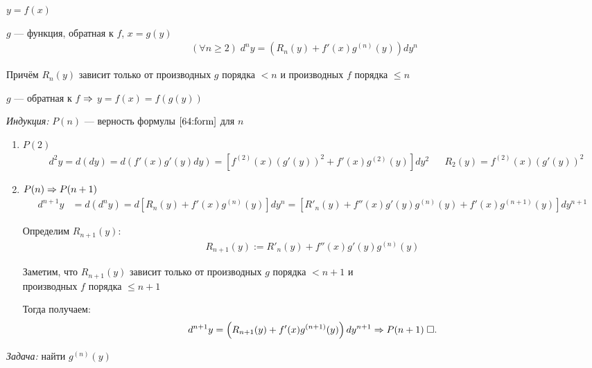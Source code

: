 \documentclass{article}
\begin{document}

\theorem

$y=f(x)$

$g$ --- функция, обратная к $f$, $x=g(y)$
\begin{align}
	(\forall n\geq 2)\;d^{n}y=\left(R_{n}(y)+f'(x)g^{(n)}(y)\right)dy^{n}\label{64:form}
\end{align}

Причём $R_{n}(y)$ зависит только от производных $g$ порядка $<n$ и производных $f$ порядка $\leq n$

\proof

$g$ --- обратная к $f$ $\Rightarrow$ $y=f(x)=f(g(y))$

{\it Индукция:} $P(n)$ --- верность формулы $\eqref{64:form}$ для $n$
\begin{enumerate}
	\item{}$P(2)$
	\begin{align*}
		 & d^{2}y=d(dy)=d(f'(x)g'(y)dy)=\left[f^{(2)}(x)(g'(y))^{2}+f'(x)g^{(2)}(y)\right]dy^{2} &  & R_2(y)=f^{(2)}(x)(g'(y))^{2}
	\end{align*}
	\item{}$P(n)\Rightarrow P(n+1)$
	\begin{align*}
		d^{n+1}y & =d(d^{n}y)=d\left[R_{n}(y)+f'(x)g^{(n)}(y)\right]dy^{n}= \left[R'_{n}(y)+f''(x)g'(y)g^{(n)}(y)+f'(x)g^{(n+1)}(y)\right]dy^{n+1}
	\end{align*}

	Определим $R_{n+1}(y)$:
	\begin{align*}
		R_{n+1}(y):=R'_{n}(y)+f''(x)g'(y)g^{(n)}(y)
	\end{align*}

	Заметим, что $R_{n+1}(y)$ зависит только от производных $g$ порядка $<n+1$ и\\
	производных $f$ порядка $\leq n+1$

	Тогда получаем:
	\begin{align*}
		d^{n+1}y=\left(R_{n+1}(y)+f'(x)g^{(n+1)}(y)\right)dy^{n+1}\Rightarrow P(n+1)\;\square.
	\end{align*}
\end{enumerate}


{\it Задача:} найти $g^{(n)}(y)$
\end{document}

